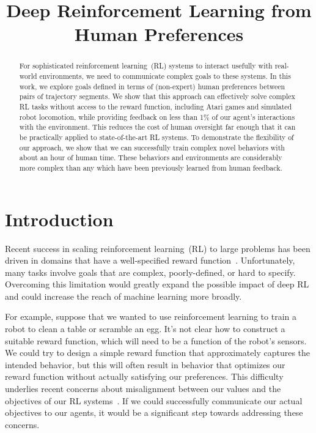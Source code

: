 \title{Deep Reinforcement Learning from Human Preferences}

\begin{abstract}
For sophisticated reinforcement learning~(RL) systems to interact usefully with real-world environments, we need to communicate complex goals to these systems. In this work, we explore goals defined in terms of (non-expert) human preferences between pairs of trajectory segments. We show that this approach can effectively solve complex RL tasks without access to the reward function, including Atari games and simulated robot locomotion, while providing feedback on less than 1\% of our agent's interactions with the environment. This reduces the cost of human oversight far enough that it can be practically applied to state-of-the-art RL systems. To demonstrate the flexibility of our approach, we show that we can successfully train complex novel behaviors with about an hour of human time. These behaviors and environments are considerably more complex than any which have been previously learned from human feedback.
\end{abstract}

\section{Introduction}
\label{sec:introduction}

Recent success in scaling reinforcement learning~(RL) to large problems has been driven in domains that have a well-specified reward function~\citep{Mnih15,Mnih16,Silver16}. Unfortunately, many tasks involve goals that are complex, poorly-defined, or hard to specify. Overcoming this limitation would greatly expand the possible impact of deep RL and could increase the reach of machine learning more broadly.

For example, suppose that we wanted to use reinforcement learning to train a robot to clean a table or scramble an egg. It's not clear how to construct a suitable reward function, which will need to be a function of the robot's sensors. We could try to design a simple reward function that approximately captures the intended behavior, but this will often result in behavior that optimizes our reward function without actually satisfying our preferences. This difficulty underlies recent concerns about misalignment between our values and the objectives of our RL systems~\citep{Bostrom14,Russell16,Amodei16}. If we could successfully communicate our actual objectives to our agents, it would be a significant step towards addressing these concerns.

